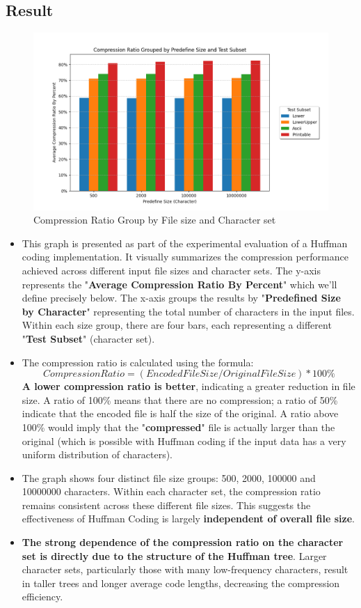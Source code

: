 \subsection{Result}
\begin{figure}[H]
    \centering
    \includegraphics[width=1\linewidth]{total.png}
    \caption{Compression Ratio Group by File size and Character set}
    \label{fig:Compression-Ratio}
\end{figure}
\begin{itemize}
    \item This graph is presented as part of the experimental evaluation of a Huffman coding implementation. It visually summarizes the compression performance achieved across different input file sizes and character sets. The y-axis represents the "\textbf{Average Compression Ratio By Percent}" which we'll define precisely below. The x-axis groups the results by "\textbf{Predefined Size by Character}" representing the total number of characters in the input files. Within each size group, there are four bars, each representing a different "\textbf{Test Subset}" (character set).
    \item The compression ratio is calculated using the formula: 
\[Compression Ratio = (Encoded File Size / Original File Size) * 100\%\]
\textbf{A lower compression ratio is better}, indicating a greater reduction in file size. A ratio of 100\% means that there are no compression; a ratio of 50\% indicate that the encoded file is half the size of the original. A ratio above 100\% would imply that the "\textbf{compressed}" file is actually larger than the original (which is possible with Huffman coding if the input data has a very uniform distribution of characters).
    \item The graph shows four distinct file size groups: 500, 2000, 100000 and 10000000 characters. Within each character set, the compression ratio remains consistent across these different file sizes. This suggests the effectiveness of Huffman Coding is largely \textbf{independent of overall file size}. 
    \item \textbf{The strong dependence of the compression ratio on the character set is directly due to the structure of the Huffman tree}. Larger character sets, particularly those with many low-frequency characters, result in taller trees and longer average code lengths, decreasing the compression efficiency.
\end{itemize}
